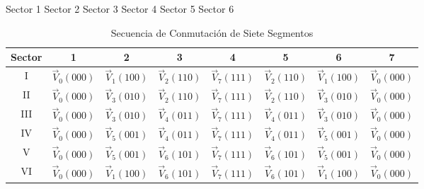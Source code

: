 \documentclass[11pt]{report}
\begin{document}
\begin{center}
	Sector 1
	Sector 2
	Sector 3
	Sector 4
	Sector 5
	Sector 6

	\begin{table}[htbp]
		\centering
		\caption{Secuencia de Conmutación de Siete Segmentos}
		\begin{tabular}{ c c c c c c c c }
			\hline
			\textbf{Sector} & \textbf{1}       & \textbf{2}       & \textbf{3}       & \textbf{4}       & \textbf{5}       & \textbf{6}       & \textbf{7}       \\
			\hline
			I               & $\vec{V}_0(000)$ & $\vec{V}_1(100)$ & $\vec{V}_2(110)$ & $\vec{V}_7(111)$ & $\vec{V}_2(110)$ & $\vec{V}_1(100)$ & $\vec{V}_0(000)$ \\
			II              & $\vec{V}_0(000)$ & $\vec{V}_3(010)$ & $\vec{V}_2(110)$ & $\vec{V}_7(111)$ & $\vec{V}_2(110)$ & $\vec{V}_3(010)$ & $\vec{V}_0(000)$ \\
			III             & $\vec{V}_0(000)$ & $\vec{V}_3(010)$ & $\vec{V}_4(011)$ & $\vec{V}_7(111)$ & $\vec{V}_4(011)$ & $\vec{V}_3(010)$ & $\vec{V}_0(000)$ \\
			IV              & $\vec{V}_0(000)$ & $\vec{V}_5(001)$ & $\vec{V}_4(011)$ & $\vec{V}_7(111)$ & $\vec{V}_4(011)$ & $\vec{V}_5(001)$ & $\vec{V}_0(000)$ \\
			V               & $\vec{V}_0(000)$ & $\vec{V}_5(001)$ & $\vec{V}_6(101)$ & $\vec{V}_7(111)$ & $\vec{V}_6(101)$ & $\vec{V}_5(001)$ & $\vec{V}_0(000)$ \\
			VI              & $\vec{V}_0(000)$ & $\vec{V}_1(100)$ & $\vec{V}_6(101)$ & $\vec{V}_7(111)$ & $\vec{V}_6(101)$ & $\vec{V}_1(100)$ & $\vec{V}_0(000)$ \\
			\hline
		\end{tabular}
	\end{table}

\end{center}
\end{document}
